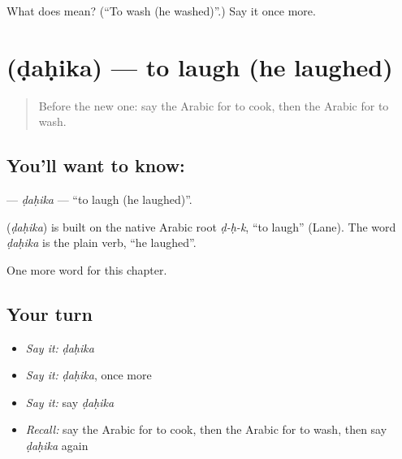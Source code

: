 \begin{tcolorbox}[breakable,colback=teal!4,colframe=teal!35!black,title={Before you move on}]
What does  mean? (\textquotedblleft{}To wash (he washed)\textquotedblright{}.) Say it once more.
\end{tcolorbox}
\section[\texorpdfstring{\ar{ضحك} (ḍaḥika)}{ضحك (ḍaḥika)}]{ (ḍaḥika) — to laugh (he laughed)}

\label{lesson:AR-C60-dahika}



\begin{quote}
Before the new one: say the Arabic for to cook, then the Arabic for to wash.
\end{quote}

\subsection*{You'll want to know: }
\textbf{} — \emph{ḍaḥika} — \textquotedblleft{}to laugh (he laughed)\textquotedblright{}.

\begin{cousinweb}
\textbf{} (\emph{ḍaḥika}) is built on the native Arabic root \emph{ḍ-ḥ-k}, \textquotedblleft{}to laugh\textquotedblright{} (Lane). The word \emph{ḍaḥika} is the plain verb, \textquotedblleft{}he laughed\textquotedblright{}.
\end{cousinweb}

\begin{grammarlens}[title={What you've built}]
One more word for this chapter.
\end{grammarlens}

\subsection*{Your turn}
\begin{itemize}
\raggedright
  \item \emph{Say it:} \emph{ḍaḥika}
  \item \emph{Say it:} \emph{ḍaḥika}, once more
  \item \emph{Say it:} say \emph{ḍaḥika}
  \item \emph{Recall:} say the Arabic for to cook, then the Arabic for to wash, then say \emph{ḍaḥika} again
\end{itemize}

